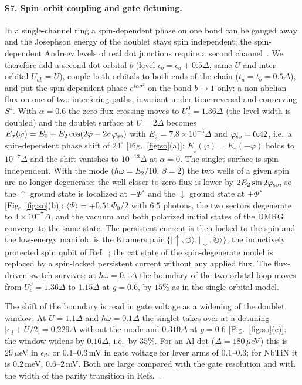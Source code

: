 \paragraph*{S7. Spin--orbit coupling and gate detuning.}
In a single-channel ring a spin-dependent phase on one bond can be gauged away and the Josephson energy of
the doublet stays spin independent; the spin-dependent Andreev levels of real dot junctions require a second
channel~\cite{Padurariu2010,Tosi2019}. We therefore add a second dot orbital $b$ (level $\epsilon_b=\epsilon_a+0.5\Delta$,
same $U$ and inter-orbital $U_{ab}=U$), couple both orbitals to both ends of the chain ($t_a=t_b=0.5\Delta$),
and put the spin-dependent phase $e^{i\alpha\sigma^z}$ on the bond $b\to1$ only: a non-abelian flux on one of two
interfering paths, invariant under time reversal and conserving $S^z$. With $\alpha=0.6$ the zero-flux crossing
moves to $U_c^0=1.36\Delta$ (the level width is doubled) and the doublet surface at $U=2\Delta$ becomes
$E_\sigma(\varphi)=E_0+E_2\cos(2\varphi-2\sigma\varphi_{\rm so})$ with $E_2=7.8\times10^{-3}\Delta$ and
$\varphi_{\rm so}=0.42$, i.e.\ a spin-dependent phase shift of $24^\circ$ [Fig.~\ref{fig:so}(a)];
$E_\downarrow(\varphi)=E_\uparrow(-\varphi)$ holds to $10^{-7}\Delta$ and the shift vanishes to $10^{-13}\Delta$ at
$\alpha=0$. The singlet surface is spin independent. With the mode ($\hbar\omega=E_2/10$, $\beta=2$) the two wells
of a given spin are no longer degenerate: the well closer to zero flux is lower by $2E_2\sin2\varphi_{\rm so}$, so
the $\uparrow$ ground state is localized at $-\Phi^\star$ and the $\downarrow$ ground state at $+\Phi^\star$
[Fig.~\ref{fig:so}(b)]: $\langle\Phi\rangle=\mp0.51\,\Phi_0/2$ with $6.5$ photons, the two sectors degenerate to
$4\times10^{-7}\Delta$, and the vacuum and both polarized initial states of the DMRG converge to the same state. The persistent current is then locked to the spin and the low-energy manifold
is the Kramers pair $\{|{\uparrow},{\circlearrowleft}\rangle,|{\downarrow},{\circlearrowright}\rangle\}$, the
inductively protected spin qubit of Ref.~\cite{delOlmo2026}; the cat state of the spin-degenerate model is
replaced by a spin-locked persistent current without any applied flux. The flux-driven switch survives:
at $\hbar\omega=0.1\Delta$ the boundary of the two-orbital loop moves from $U_c^0=1.36\Delta$ to $1.15\Delta$ at $g=0.6$, by $15\%$ as in the single-orbital model.

The shift of the boundary is read in gate voltage as a widening of the doublet window. At $U=1.1\Delta$ and
$\hbar\omega=0.1\Delta$ the singlet takes over at a detuning $|\epsilon_d+U/2|=0.229\Delta$ without the mode and
$0.310\Delta$ at $g=0.6$ [Fig.~\ref{fig:so}(c)]: the window widens by $0.16\Delta$, i.e.\ by $35\%$. For an Al
dot ($\Delta=180\,\mu$eV) this is $29\,\mu$eV in $\epsilon_d$, or $0.1$--$0.3$\,mV in gate voltage for lever arms
of $0.1$--$0.3$; for NbTiN it is $0.2$\,meV, $0.6$--$2$\,mV. Both are large compared with the gate resolution and
with the width of the parity transition in Refs.~\cite{Bargerbos2022,PitaVidal2023}.

